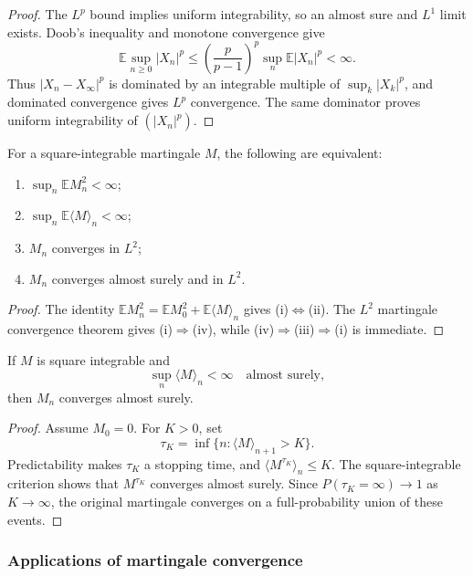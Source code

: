 \begin{proof}
The $L^p$ bound implies uniform integrability, so an almost sure and $L^1$
limit exists. Doob's inequality and monotone convergence give
\[
\mathbb E\sup_{n\geq0}|X_n|^p
 \leq\left(\frac p{p-1}\right)^p
      \sup_n\mathbb E|X_n|^p<\infty.
\]
Thus $|X_n-X_\infty|^p$ is dominated by an integrable multiple of
$\sup_k|X_k|^p$, and dominated convergence gives $L^p$ convergence. The same
dominator proves uniform integrability of $(|X_n|^p)$.
\end{proof}

\begin{cor}
For a square-integrable martingale $M$, the following are equivalent:
\begin{enumerate}[label=(\roman*)]
  \item $\sup_n\mathbb EM_n^2<\infty$;
  \item $\sup_n\mathbb E\langle M\rangle_n<\infty$;
  \item $M_n$ converges in $L^2$;
  \item $M_n$ converges almost surely and in $L^2$.
\end{enumerate}
\end{cor}

\begin{proof}
The identity
$\mathbb EM_n^2=\mathbb EM_0^2+\mathbb E\langle M\rangle_n$ gives
(i)$\Leftrightarrow$(ii). The $L^2$ martingale convergence theorem gives
(i)$\Rightarrow$(iv), while (iv)$\Rightarrow$(iii)$\Rightarrow$(i) is
immediate.
\end{proof}

\begin{thm}
If $M$ is square integrable and
\[
\sup_n\langle M\rangle_n<\infty
\quad\text{almost surely},
\]
then $M_n$ converges almost surely.
\end{thm}

\begin{proof}
Assume $M_0=0$. For $K>0$, set
\[
\tau_K=\inf\{n:\langle M\rangle_{n+1}>K\}.
\]
Predictability makes $\tau_K$ a stopping time, and
$\langle M^{\tau_K}\rangle_n\leq K$. The square-integrable criterion shows
that $M^{\tau_K}$ converges almost surely. Since
$P(\tau_K=\infty)\to1$ as $K\to\infty$, the original martingale converges on
a full-probability union of these events.
\end{proof}

\subsubsection{Applications of martingale convergence}

